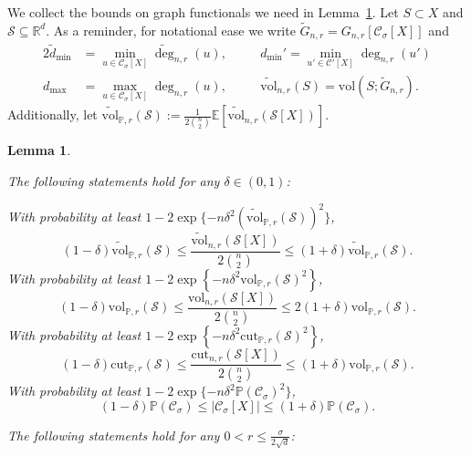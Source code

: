 \documentclass[11pt,twoside]{article}
\newtheorem{lemma}{Lemma}
\theoremstyle{definition}
\newcommand{\set}[1]{\left\{#1\right\}}
\newcommand{\vol}{\mathrm{vol}}
\newcommand{\cut}{\mathrm{cut}}
\newcommand{\abs}[1]{\left \lvert #1 \right \rvert}
\newcommand{\Reals}{\mathbb{R}}
\newcommand{\Rd}{\Reals^d}
\newcommand{\1}{\mathbbm{1}}
\newcommand{\Xbf}{X}
\newcommand{\Pbb}{\mathbb{P}}
\newcommand{\Sset}{\mathcal{S}}
\newcommand{\Cset}{\mathcal{C}}
\newcommand{\Csig}{\Cset_{\sigma}}
\begin{document}
We collect the bounds on graph functionals we need in Lemma~\ref{lem:ball_bounds_in_probability}. Let $S \subset X$ and $\mathcal{S} \subseteq \Rd$. As a reminder, for notational ease we write $\widetilde{G}_{n,r} = G_{n,r}[\Csig[\Xbf]]$ and
\begin{alignat*}{2}
\widetilde{d}_{\min} & = \min_{u \in \Csig[\Xbf]} \widetilde{\deg}_{n,r}(u), \quad && d_{\min}' = \min_{u' \in \Cset'[\Xbf]} {\deg}_{n,r}(u') \\
d_{\max} & = \max_{u \in \Csig[\Xbf]} \deg_{n,r}(u), \quad && \widetilde{\vol}_{n,r}(S) = \vol(S; \widetilde{G}_{n,r}). 
\end{alignat*}
Additionally, let $\widetilde{\vol}_{\Pbb,r}(\mathcal{S}) := \frac{1}{2{n \choose 2}}\mathbb{E}[\widetilde{\vol}_{n,r}(\mathcal{S}[\Xbf])]$.
\begin{lemma}
	\label{lem:ball_bounds_in_probability} \label{lem:graph_functional_concentration}
	\item[]
	The following statements hold for any $\delta \in (0,1)$:
	
	\noindent With probability at least $1 - 2\exp\{-n\delta^2(\widetilde{\vol}_{\Pbb,r}(\mathcal{S}))^2\}$,
	\begin{equation}
	\label{eqn:volwt_bound}
	(1 - \delta) \widetilde{\vol}_{\Pbb,r}(\mathcal{S}) \leq \frac{\widetilde{\vol}_{n,r}(\mathcal{S}[\Xbf])}{2{n \choose 2}} \leq (1 + \delta) \widetilde{\vol}_{\Pbb,r}(\mathcal{S}).
	\end{equation}
	With probability at least $1 - 2\exp\set{-n \delta^2 \vol_{\Pbb,r}(\Sset)^2}$,
	\begin{equation}
	\label{eqn:vol_bound}
	(1 - \delta)\vol_{\Pbb,r}(\Sset) \leq \frac{\vol_{n,r}(\Sset[\Xbf])}{2{n \choose 2}}\leq 2(1 + \delta)\vol_{\Pbb,r}(\Sset).
	\end{equation}
	With probability at least $1 - 2\exp\set{-n \delta^2 \cut_{\Pbb,r}(\Sset)^2}$,
	\begin{equation}
	\label{eqn:cut_bound}
	(1 - \delta)\cut_{\Pbb,r}(\Sset) \leq \frac{\cut_{n,r}(\Sset[\Xbf])}{2{n \choose 2}}\leq (1 + \delta)\vol_{\Pbb,r}(\Sset).
	\end{equation}
	With probability at least $1 - 2\exp\{-n\delta^2\Pbb(\Csig)^2\}$, 
	\begin{equation}
	\label{eqn:cardinality}
	(1 - \delta) \Pbb(\Csig) \leq \abs{\Csig[\Xbf]} \leq (1 + \delta) \Pbb(\Csig).
	\end{equation}
	
	\noindent The following statements hold for any $0 < r \leq \frac{\sigma}{2\sqrt{d}}$:
	

\end{lemma}
\end{document}

